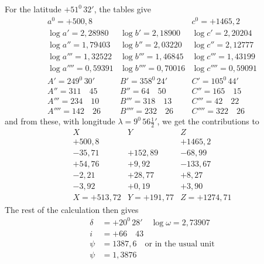 For the latitude $+51^0\,32'$, the tables give
\[
\begin{array}{r|r|r}
a^0=+500{,}8&&c^0=+1465{,}2\\
\log a'=2{,}28980&\log b'=2{,}18900&\log c'=2{,}20204\\
\log a''=1{,}79403&\log b''=2{,}03220&\log c''=2{,}12777\\
\log a'''=1{,}32522&\log b'''=1{,}46845&\log c'''=1{,}43199\\
\log a''''=0{,}59391&\log b''''=0{,}70016&\log c''''=0{,}59091\\
A'=249^0\,30'&B'=358^0\,24'&C'=105^0\,44'\\
A''=311\quad45&B''=64\quad50&C''=165\quad15\\
A'''=234\quad10&B'''=318\quad13&C'''=42\quad22\\
A''''=142\quad26&B''''=232\quad26&C''''=322\quad26
\end{array}
\]
and from these, with longitude $\lambda=9^0\,56\frac12'$, we get the contributions to
\[
\begin{array}{r|r|r}
X&Y&Z\\\hline
+500{,}8&&+1465{,}2\\
-35{,}71&+152{,}89&-68{,}99\\
+54{,}76&+9{,}92&-133{,}67\\
-2{,}21&+28{,}77&+8{,}27\\
-3{,}92&+0{,}19&+3{,}90\\\hline
X=+513{,}72&Y=+191{,}77&Z=+1274{,}71
\end{array}
\]
The rest of the calculation then gives
\[
\begin{aligned}
\delta&=+20^0\,28'\quad\log\omega=2{,}73907\\
i&=+66\quad43\\
\psi&=1387{,}6\quad\text{or in the usual unit}\\
\psi&=1{,}3876
\end{aligned}
\]

